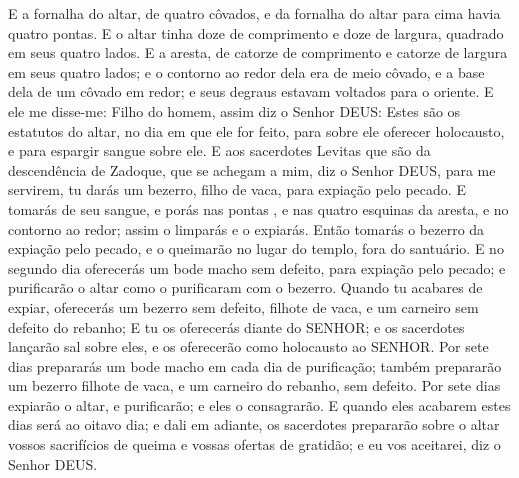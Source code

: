 {  E a fornalha do altar, de quatro côvados, e da fornalha do altar para cima havia quatro pontas.
  E o altar tinha doze
{} de comprimento e doze de largura, quadrado em seus quatro lados.
  E a aresta, de catorze
{} de comprimento e catorze de largura em seus quatro lados; e o contorno ao redor dela era de meio côvado, e a base dela de um côvado em redor; e seus degraus estavam voltados para o oriente.
  E ele me disse-me: Filho do homem, assim diz o Senhor DEUS: Estes são os estatutos do altar, no dia em que ele for feito, para sobre ele oferecer holocausto, e para espargir sangue sobre ele.
  E aos sacerdotes Levitas que são da descendência
 de Zadoque, que se achegam a mim, diz o Senhor DEUS, para me servirem, tu darás um bezerro, filho de vaca, para expiação pelo pecado.
  E tomarás de seu sangue, e porás nas pontas
{},  e nas quatro esquinas da aresta, e no contorno ao redor; assim o limparás e o expiarás.
  Então tomarás o bezerro da expiação pelo pecado, e o queimarão no lugar
{} do templo, fora do santuário.
  E no segundo dia oferecerás um bode macho sem defeito, para expiação pelo pecado; e purificarão
 o altar como o purificaram com o bezerro.
  Quando tu acabares de expiar, oferecerás um bezerro sem defeito, filhote de vaca,  e um carneiro sem defeito do rebanho;
  E tu os oferecerás diante do SENHOR; e os sacerdotes lançarão sal sobre eles, e os oferecerão como holocausto ao SENHOR.
  Por sete dias prepararás um bode macho em cada dia de purificação; também prepararão um bezerro filhote de vaca, e um carneiro do rebanho,
{} sem defeito.
  Por sete dias expiarão o altar, e
{} purificarão; e eles o consagrarão.
  E quando eles acabarem estes dias será ao oitavo dia; e dali em adiante, os sacerdotes prepararão sobre o altar vossos sacrifícios de queima e vossas ofertas de gratidão; e eu vos aceitarei, diz o Senhor DEUS.
\par }

